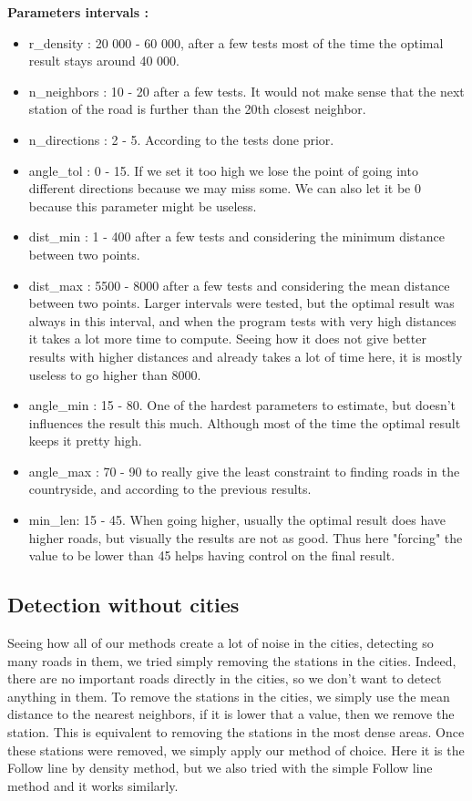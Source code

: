 \documentclass[main.tex]{subfiles}
\begin{document}
\textbf{Parameters intervals : }
\begin{itemize}
    \item r\_density : 20 000 - 60 000, after a few tests most of the time the optimal result stays around 40 000.
    \item n\_neighbors : 10 - 20 after a few tests. It would not make sense that the next station of the road is further than the 20th closest neighbor. 
    \item n\_directions : 2 - 5. According to the tests done prior.
    \item angle\_tol : 0 - 15. If we set it too high we lose the point of going into different directions because we may miss some. We can also let it be 0 because this parameter might be useless.
    \item dist\_min :  1 - 400 after a few tests and considering the minimum distance between two points.
    \item dist\_max :  5500 - 8000 after a few tests and considering the mean distance between two points. Larger intervals were tested, but the optimal result was always in this interval, and when the program tests with very high distances it takes a lot more time to compute. Seeing how it does not give better results with higher distances and already takes a lot of time here, it is mostly useless to go higher than 8000.
    \item angle\_min : 15 - 80. One of the hardest parameters to estimate, but doesn't influences the result this much. Although most of the time the optimal result keeps it pretty high.
    \item angle\_max : 70 - 90 to really give the least constraint to finding roads in the countryside, and according to the previous results. 
    \item min\_len:  15 - 45. When going higher, usually the optimal result does have higher roads, but visually the results are not as good. Thus here "forcing" the value to be lower than 45 helps having control on the final result. 
\end{itemize}


\subsection{Detection without cities}

Seeing how all of our methods create a lot of noise in the cities, detecting so many roads in them, we tried simply removing the stations in the cities. Indeed, there are no important roads directly in the cities, so we don't want to detect anything in them. To remove the stations in the cities, we simply use the mean distance to the nearest neighbors, if it is lower that a value, then we remove the station. This is equivalent to removing the stations in the most dense areas. Once these stations were removed, we simply apply our method of choice. Here it is the Follow line by density method, but we also tried with the simple Follow line method and it works similarly.
\end{document}
